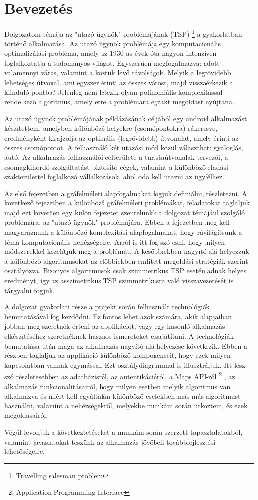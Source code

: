 \chapter{Bevezetés}

Dolgozatom témája az "utazó ügynök" problémájának (TSP)%
\footnote{ %
	Travelling salesman problem
}  %
 a gyakorlatban történő alkalmazása. Az utazó ügynök problémája egy komputacionális optimalizálási probléma, amely az 1930-as évek óta nagyon intenzíven foglalkoztatja a tudományos világot. Egyszerűen megfogalmazva: adott valamennyi város, valamint a köztük levő távolságok. Melyik a legrövidebb lehetséges útvonal, ami egyszer érinti az összes várost, majd visszaérkezik a kiinduló pontba? Jelenleg nem létezik olyan polinomiális komplexitással rendelkező algoritmus, amely erre a problémára egzakt megoldást nyújtana.

Az utazó ügynök problémájának példázásának céljából egy android alkalmazást készítettem, amelyben különböző helyekre (csomópontokra) rákeresve, eredményként kirajzolja az optimális (legrövidebb) útvonalat, amely érinti az összes csomópontot. A felhasználó két utazási mód közül választhat: gyaloglás, autó. Az alkalmazás felhasználói célterülete a turistaútvonalak tervezői, a csomagkihordó szolgáltatást biztosító cégek, valamint a különböző eladási szakterülettel foglalkozó vállalkozások, ahol oda kell utazni az ügyfélhez.

Az első fejezetben a gráfelméleti alapfogalmakat fogjuk definiálni, részletezni. A következő fejezetben a különböző gráfelméleti problémákat, feladatokat taglaljuk, majd ezt követően egy külön fejezetet szentelünkk a dolgozat témájául szolgáló problémára, az "utazó ügynök" problémájára. Ebben a fejezetben meg kell magyaráznunk a különböző komplexitási alapfogalmakat, hogy rávilágítsunk a téma komputacionális nehézségeire. Arról is itt fog szó esni, hogy milyen módszerekkel közelítjük meg a problémát. A későbbiekben nagyító alá helyezzük a különböző algoritmusokat az előbbiekben emlitett megoldási stratégiák szerint osztályozva. Bizonyos algoritmusok csak szimmetrikus TSP esetén adnak helyes eredményt, így az asszimetrikus TSP szimmetrikusra való visszavezetését is tárgyalni fogjuk.

A dolgozat gyakorlati része a projekt során felhasznált technológiák bemutatásával fog kezdődni. Ez fontos lehet azok számára, akik alapjaiban jobban meg szeretnék érteni az applikációt, vagy egy hasonló alkalmazás elkészítéséhez szeretnéknek hasznos ismereteket elsajátítani. A technológiák bemutatása után maga az alkalmazás nagyító alá helyezése következik. Ebben a részben taglaljuk az applikáció különböző komponenseit, hogy ezek milyen kapcsolatban vannak egymással. Ezt osztálydiagrammal is illusztráljuk. Itt lesz szó részletesebben az adatbázisról, az autentikációról, a Maps API-ról%
\footnote{ %
	Application Programming Interface
}  %
, az alkalmazás funkcionalitásairól, hogy milyen esetben melyik algoritmus van alkalmazva és miért kell egyáltalán különböző esetekben más-más algoritmust használni, valamint a nehézségekről, melyekbe munkám során ütköztem, és ezek megoldásairól.

Végül levonjuk a következtetéseket a munkám során szerzett tapasztalatokból, valamint javaslatokat teszünk az alkalmazás jövőbeli továbbfejlesztési lehetőségeire.
